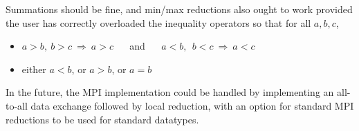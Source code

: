 \documentclass[12pt]{article}
\begin{document}
Summations should be fine, and min/max reductions also ought to work 
provided the user has correctly overloaded the inequality operators 
so that for all $a, b, c$, 
\begin{itemize}
\item\vspace*{-0.1in} $a\!>\!b,\  b\!>\!c\ \Longrightarrow\ a\!>\!c$ 
           ~~ and ~~   $a\!<\!b,\ \ b\!<\!c\ \Longrightarrow\ a\!<\!c$ 
\item\vspace*{-0.1in}  either $a\!<\!b$, or $a\!>\!b$, or $a\!=\!b$
\end{itemize}

In the future, the MPI implementation could be handled by
implementing an all-to-all data exchange followed by local reduction,
with an option for standard MPI reductions to be used for standard datatypes.
\end{document}
